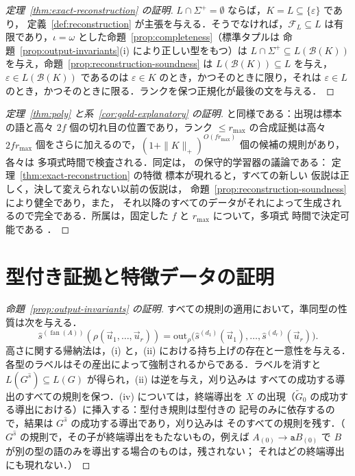 \documentclass[11pt,a4paper]{ltjsarticle}
\numberwithin{equation}{section}
\theoremstyle{plain}
\theoremstyle{definition}
\theoremstyle{remark}
\newcommand{\out}{\mathrm{out}}
\newcommand{\tuple}[1]{\vec{#1}}
\newcommand{\eps}{\varepsilon}
\newcommand{\fan}{\operatorname{fan}}
\theoremstyle{plain}
\begin{document}
\begin{proof}[定理~\ref{thm:exact-reconstruction} の証明]
$L\cap\Sigma^+=\emptyset$ ならば，$K=L\subseteq\{\eps\}$ であり，
定義~\ref{def:reconstruction} が主張を与える．そうでなければ，$\mathcal F_L\subseteq L$
は有限であり，$\iota=\omega$ とした命題~\ref{prop:completeness}（標準タプルは
命題~\ref{prop:output-invariants}(i) により正しい型をもつ）は
$L\cap\Sigma^+\subseteq L(\mathcal B(K))$ を与え，命題~\ref{prop:reconstruction-soundness}
は $L(\mathcal B(K))\subseteq L$ を与え，$\eps\in L(\mathcal B(K))$ であるのは $\eps\in K$ のとき，かつそのときに限り，それは
$\eps\in L$ のとき，かつそのときに限る．ランクを保つ正規化が最後の文を与える．
\end{proof}

\begin{proof}[定理~\ref{thm:poly} と系~\ref{cor:gold-explanatory} の証明]
\cite[Lemma~6]{Yoshinaka2011} と同様である：出現は標本の語と高々
$2f$ 個の切れ目の位置であり，ランク $\le r_{\max}$ の合成証拠は高々
$2fr_{\max}$ 個をさらに加えるので，$(1+\|K\|_+)^{O(fr_{\max})}$ 個の候補の規則があり，各々は
多項式時間で検査される．同定は，
\cite[Corollary~1 and Theorem~1]{Yoshinaka2011} の保守的学習器の議論である：
定理~\ref{thm:exact-reconstruction} の特徴
標本が現れると，すべての新しい
仮説は正しく，決して変えられない以前の仮説は，
命題~\ref{prop:reconstruction-soundness} により健全であり，また，
それ以降のすべてのデータがそれによって生成されるので完全である．所属は，固定した $f$ と $r_{\max}$ について，多項式
時間で決定可能である \cite[Proposition~4]{Yoshinaka2011}．
\end{proof}

\section{型付き証拠と特徴データの証明}
\label{app:typed-witness-aux-proofs}

\begin{proof}[命題~\ref{prop:output-invariants} の証明]
すべての規則の適用において，準同型の性質は次を与える．
\[
 \widehat s^{(\fan(A))}(\rho(\tuple u_1,\ldots,\tuple u_r))=
 \out_\rho\bigl(\widehat s^{(d_1)}(\tuple u_1),\ldots,\widehat s^{(d_r)}(\tuple u_r)\bigr).
\]  高さに関する帰納法は，(i) と，(ii) における持ち上げの存在と一意性を与える．
各型のラベルはその産出によって強制されるからである．ラベルを消すと
$L(G^{\widehat s})\subseteq L(G)$ が得られ，(ii) は逆を与え，刈り込みは
すべての成功する導出のすべての規則を保つ．(iv) については，終端導出を
$X$ の出現（$\widetilde G_0$ の成功する導出における）に挿入する：型付き規則は型付きの
記号のみに依存するので，結果は $G^{\widehat s}$ の成功する導出であり，刈り込みは
そのすべての規則を残す．（$G^{\widehat s}$ の規則で，その子が終端導出をもたないもの，例えば
$A_{(0)}\to\mathtt aB_{(0)}$ で $B$ が別の型の語のみを導出する場合のものは，残されない；
それはどの終端導出にも現れない．）
\end{proof}
\end{document}
